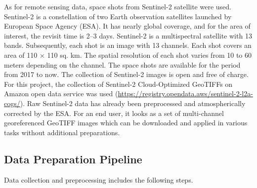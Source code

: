 \documentclass{article}
\begin{document}
As for remote sensing data, space shots from Sentinel-2 satellite were used. Sentinel-2 is a constellation of two Earth observation satellites launched by European Space Agency (ESA). It has nearly global coverage, and for the area of interest, the revisit time is 2–3 days. Sentinel-2 is a multispectral satellite with 13 bands. Subsequently, each shot is an image with 13 channels. Each shot covers an area of 110 × 110 sq. km. The spatial resolution of each shot varies from 10 to 60 meters depending on the channel. The space shots are available for the period from 2017 to now. The collection of Sentinel-2 images is open and free of charge. For this project, the collection of Sentinel-2 Cloud-Optimized GeoTIFFs on Amazon open data service was used (\url{https://registry.opendata.aws/sentinel-2-l2a-cogs/}). Raw Sentinel-2 data has already been preprocessed and atmospherically corrected by the ESA. For an end user, it looks as a set of multi-channel georeferenced GeoTIFF images which can be downloaded and applied in various tasks without additional preparations.

\subsection{Data Preparation Pipeline}

Data collection and preprocessing includes the following steps.
\end{document}
